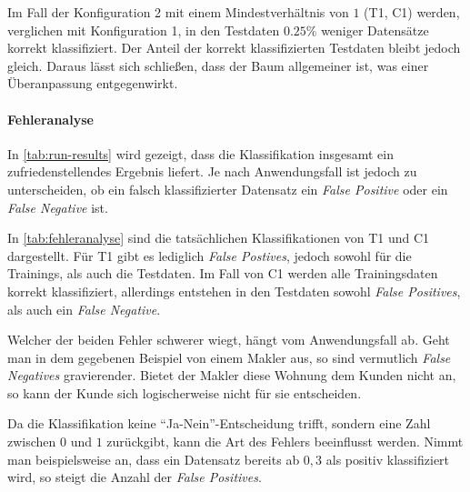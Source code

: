 Im Fall der Konfiguration 2 mit einem Mindestverhältnis von $1$ (T1, C1) werden, verglichen mit Konfiguration 1, in den Testdaten $0.25\%$ weniger Datensätze korrekt klassifiziert.
Der Anteil der korrekt klassifizierten Testdaten bleibt jedoch gleich.
Daraus lässt sich schließen,
dass der Baum allgemeiner ist, was einer Überanpassung entgegenwirkt.

\paragraph{Fehleranalyse}
In \autoref{tab:run-results} wird gezeigt, dass die Klassifikation insgesamt ein zufriedenstellendes Ergebnis liefert.
Je nach Anwendungsfall ist jedoch zu unterscheiden,
ob ein falsch klassifizierter Datensatz ein \emph{False Positive} oder ein \emph{False Negative} ist.

In \autoref{tab:fehleranalyse} sind die tatsächlichen Klassifikationen von T1 und C1 dargestellt.
Für T1 gibt es lediglich \emph{False Postives}, jedoch sowohl für die Trainings,
als auch die Testdaten.
Im Fall von C1 werden alle Trainingsdaten korrekt klassifiziert,
allerdings entstehen in den Testdaten sowohl \emph{False Positives}, als auch ein \emph{False Negative}.

Welcher der beiden Fehler schwerer wiegt, hängt vom Anwendungsfall ab.
Geht man in dem gegebenen Beispiel von einem Makler aus,
so sind vermutlich \emph{False Negatives} gravierender.
Bietet der Makler diese Wohnung dem Kunden nicht an,
so kann der Kunde sich logischerweise nicht für sie entscheiden.

Da die Klassifikation keine \enquote{Ja-Nein}-Entscheidung trifft,
sondern eine Zahl zwischen $0$ und $1$ zurückgibt,
kann die Art des Fehlers beeinflusst werden.
Nimmt man beispielsweise an,
dass ein Datensatz bereits ab $0,3$ als positiv klassifiziert wird,
so steigt die Anzahl der \emph{False Positives}.


